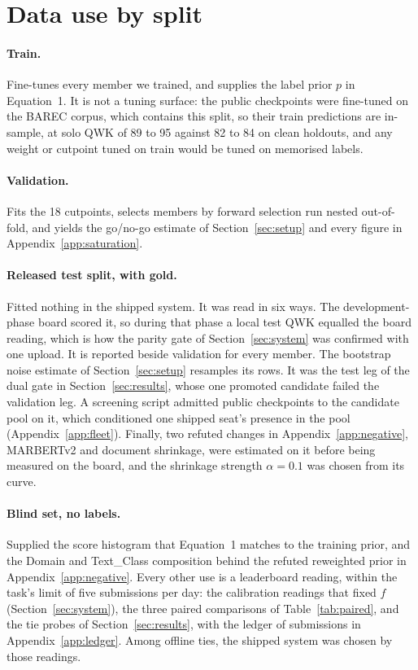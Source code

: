 \section{Data use by split}
\label{app:datause}

\paragraph{Train.} Fine-tunes every member we trained, and supplies the label prior $p$ in
Equation~1. It is not a tuning surface: the public checkpoints were fine-tuned on the BAREC
corpus, which contains this split, so their train predictions are in-sample, at solo QWK of
89 to 95 against 82 to 84 on clean holdouts, and any weight or cutpoint tuned on train would
be tuned on memorised labels.

\paragraph{Validation.} Fits the 18 cutpoints, selects members by forward selection run
nested out-of-fold, and yields the go/no-go estimate of Section~\ref{sec:setup} and every
figure in Appendix~\ref{app:saturation}.

\paragraph{Released test split, with gold.} Fitted nothing in the shipped system. It was
read in six ways. The development-phase board scored it, so during that phase a local test
QWK equalled the board reading, which is how the parity gate of Section~\ref{sec:system} was
confirmed with one upload. It is reported beside validation for every member. The bootstrap
noise estimate of Section~\ref{sec:setup} resamples its rows. It was the test leg of the dual
gate in Section~\ref{sec:results}, whose one promoted candidate failed the validation leg. A
screening script admitted public checkpoints to the candidate pool on it, which conditioned
one shipped seat's presence in the pool (Appendix~\ref{app:fleet}). Finally, two refuted
changes in Appendix~\ref{app:negative}, MARBERTv2 and document shrinkage, were estimated on
it before being measured on the board, and the shrinkage strength $\alpha = 0.1$ was chosen
from its curve.

\paragraph{Blind set, no labels.} Supplied the score histogram that Equation~1 matches to
the training prior, and the Domain and Text\_Class composition behind the refuted
reweighted prior in Appendix~\ref{app:negative}. Every other use is a leaderboard reading,
within the task's limit of five submissions per day: the calibration readings that fixed $f$
(Section~\ref{sec:system}), the three paired comparisons of Table~\ref{tab:paired}, and the
tie probes of Section~\ref{sec:results}, with the ledger of submissions in
Appendix~\ref{app:ledger}. Among offline ties, the shipped system was chosen by those
readings.


